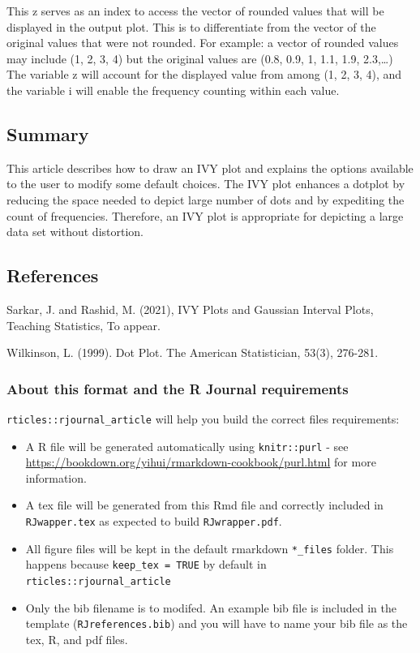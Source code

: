 This z serves as an index to access the vector of rounded values that
will be displayed in the output plot. This is to differentiate from the
vector of the original values that were not rounded. For example: a
vector of rounded values may include (1, 2, 3, 4) but the original
values are (0.8, 0.9, 1, 1.1, 1.9, 2.3,\ldots) The variable z will
account for the displayed value from among (1, 2, 3, 4), and the
variable i will enable the frequency counting within each value.

\hypertarget{summary}{%
\subsection{Summary}\label{summary}}

This article describes how to draw an IVY plot and explains the options
available to the user to modify some default choices. The IVY plot
enhances a dotplot by reducing the space needed to depict large number
of dots and by expediting the count of frequencies. Therefore, an IVY
plot is appropriate for depicting a large data set without distortion.

\hypertarget{references}{%
\subsection{References}\label{references}}

Sarkar, J. and Rashid, M. (2021), IVY Plots and Gaussian Interval Plots,
Teaching Statistics, To appear.

Wilkinson, L. (1999). Dot Plot. The American Statistician, 53(3),
276-281.

\hypertarget{about-this-format-and-the-r-journal-requirements}{%
\subsubsection{About this format and the R Journal
requirements}\label{about-this-format-and-the-r-journal-requirements}}

\texttt{rticles::rjournal\_article} will help you build the correct
files requirements:

\begin{itemize}
\tightlist
\item
  A R file will be generated automatically using \texttt{knitr::purl} -
  see \url{https://bookdown.org/yihui/rmarkdown-cookbook/purl.html} for
  more information.
\item
  A tex file will be generated from this Rmd file and correctly included
  in \texttt{RJwapper.tex} as expected to build \texttt{RJwrapper.pdf}.
\item
  All figure files will be kept in the default rmarkdown
  \texttt{*\_files} folder. This happens because
  \texttt{keep\_tex\ =\ TRUE} by default in
  \texttt{rticles::rjournal\_article}
\item
  Only the bib filename is to modifed. An example bib file is included
  in the template (\texttt{RJreferences.bib}) and you will have to name
  your bib file as the tex, R, and pdf files.
\end{itemize}

